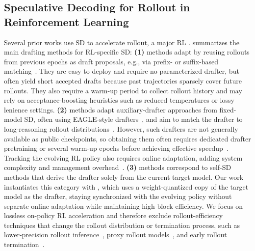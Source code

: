 \subsection{Speculative Decoding for Rollout in Reinforcement Learning}



Several prior works use SD to accelerate rollout, a major RL \bottleneck{}.
 summarizes the main drafting methods for RL-specific SD:
\textbf{(1) \History{}} methods adapt \nonparametric{} by reusing rollouts from previous epochs as draft proposals, e.g., via prefix- or suffix-based matching~\citep{liu2025spec,he2025history,shao2025beat}.
They are easy to deploy and require no parameterized drafter, but often yield short accepted drafts because past trajectories sparsely cover future rollouts. They also require a warm-up period to collect rollout history and may rely on acceptance-boosting heuristics such as reduced temperatures or lossy lenience settings.
\textbf{(2) \Learned{}} methods adapt auxiliary-drafter approaches from fixed-model SD, often using EAGLE-style drafters~\citep{li2024eagle,li2025eagle}, and aim to match the drafter to long-reasoning rollout distributions~\citep{zhang2025fastgrpo,chen2025respec,hu2026taming,iso2026accelerating}.
However, such drafters are not generally available as public checkpoints, so obtaining them often requires dedicated drafter pretraining or several warm-up epochs before achieving effective speedup~\citep{zhang2025fastgrpo}.
Tracking the evolving RL policy also requires online adaptation, adding system complexity and management overhead~\citep{hu2026taming}.
\textbf{(3) \TargetInduced{}} methods correspond to self-SD methods that derive the drafter solely from the current target model.
Our work instantiates this category with \textbf{\methodtitle{}}, which uses a weight-quantized copy of the target model as the drafter, staying synchronized with the evolving policy without separate online adaptation while maintaining high block efficiency.
We focus on lossless on-policy RL acceleration and therefore exclude rollout-efficiency techniques that change the rollout distribution or termination process, such as lower-precision rollout inference~\citep{li2026qurl}, proxy rollout models~\citep{chen2026jackpot}, and early rollout termination~\citep{zhang2026sortedrl,zhou2025april}.

